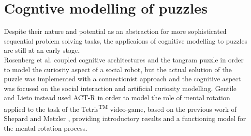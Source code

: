 \documentclass[a4paper,singleside,12pt]{report} %
\begin{document}
	\section{Cogntive modelling of puzzles}
	Despite their nature and potential as an abstraction for more sophisticated sequential problem
	solving tasks, the applicaions of cognitive modelling to puzzles are still at an early stage.\\
	Rosenberg et al. \cite{social-robot} coupled cognitive architectures and the tangram puzzle	in
	order to model the curiosity aspect of a social robot, but the actual solution of the puzzle was
	implemented with a connectionist approach and the cognitive aspect was focused on the social
	interaction and artificial curiosity modelling. Gentile and Lieto \cite{GENTILE20221} instead
	used ACT-R in order to model the role of mental rotation applied to the task of the
	Tetris\textsuperscript{TM} video-game, based on the previous work of Shepard and
	Metzler \cite{shepard1971mental}, providing introductory results and a functioning model for the
	mental rotation process.
\end{document}
